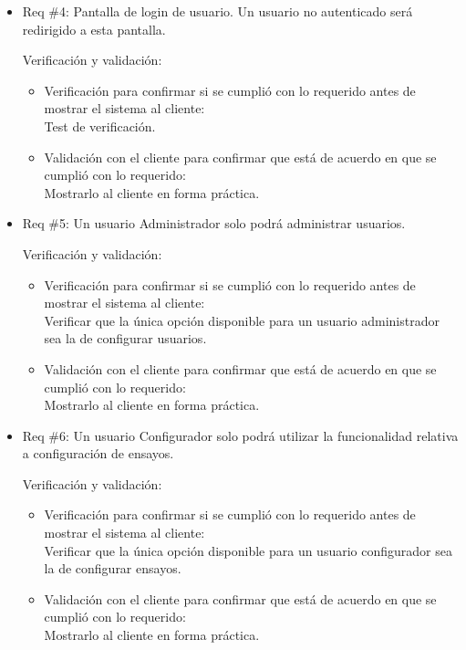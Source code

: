 \documentclass[11pt]{charter}
\begin{document}
\begin{itemize}
\item Req \#4: Pantalla de login de usuario. Un usuario no autenticado será redirigido a esta pantalla.

Verificación y validación:

\begin{itemize}
\item Verificación para confirmar si se cumplió con lo requerido antes de mostrar el sistema al cliente:\\
Test de verificación.
\item Validación con el cliente para confirmar que está de acuerdo en que se cumplió con lo requerido:\\
Mostrarlo al cliente en forma práctica.
\end{itemize}

\item Req \#5: Un usuario Administrador solo podrá administrar usuarios.

Verificación y validación:

\begin{itemize}
\item Verificación para confirmar si se cumplió con lo requerido antes de mostrar el sistema al cliente:\\
Verificar que la única opción disponible para un usuario administrador sea la de configurar usuarios.
\item Validación con el cliente para confirmar que está de acuerdo en que se cumplió con lo requerido:\\
Mostrarlo al cliente en forma práctica.
\end{itemize}

\item Req \#6: Un usuario Configurador solo podrá utilizar la funcionalidad relativa a configuración de ensayos.

Verificación y validación:

\begin{itemize}
\item Verificación para confirmar si se cumplió con lo requerido antes de mostrar el sistema al cliente:\\
Verificar que la única opción disponible para un usuario configurador sea la de configurar ensayos.
\item Validación con el cliente para confirmar que está de acuerdo en que se cumplió con lo requerido:\\
Mostrarlo al cliente en forma práctica.
\end{itemize}


\end{itemize}
\end{document}
